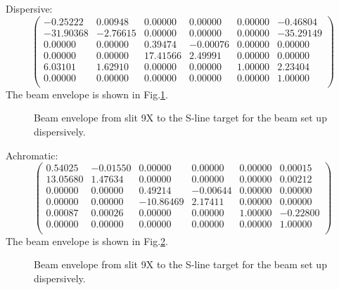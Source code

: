 \documentclass[11pt]{report}
\begin{document}
Dispersive:
\begin{equation}
\begin{pmatrix}
   -0.25222  &  0.00948  & 0.00000  & 0.00000  & 0.00000 & -0.46804 \\
   -31.90368 & -2.76615  & 0.00000  & 0.00000  & 0.00000 &-35.29149 \\
   0.00000   &  0.00000  & 0.39474  & -0.00076 & 0.00000 &  0.00000 \\
   0.00000   &  0.00000  & 17.41566 & 2.49991  & 0.00000 &  0.00000 \\
   6.03101   &  1.62910  & 0.00000  & 0.00000  & 1.00000 &  2.23404 \\
   0.00000   &  0.00000  & 0.00000  & 0.00000  & 0.00000 &  1.00000 \\
\end{pmatrix} 
\end{equation}
\noindent The beam envelope is shown in Fig.\ref{fig:beam-disp}.

\begin{figure}[!ht]
\centerline{\vspace{0cm}\hspace{0cm}
}
\centering
\caption{Beam envelope from slit 9X to the S-line target for the beam set up dispersively.}
\label{fig:beam-disp}
\end{figure} 

Achromatic:
\begin{equation}
\begin{pmatrix}
    0.54025  & -0.01550  & 0.00000   & 0.00000  & 0.00000 &  0.00015 \\
    13.05680 &  1.47634  & 0.00000   & 0.00000  & 0.00000 &  0.00212 \\
    0.00000  &  0.00000  & 0.49214   & -0.00644 & 0.00000 &  0.00000 \\ 
    0.00000  &  0.00000  & -10.86469 & 2.17411  & 0.00000 &  0.00000 \\
    0.00087  &  0.00026  & 0.00000   & 0.00000  & 1.00000 & -0.22800 \\ 
    0.00000  &  0.00000  & 0.00000   & 0.00000  & 0.00000 &  1.00000 \\
\end{pmatrix} 
\end{equation}
\noindent The beam envelope is shown in Fig.\ref{fig:beam-achr}.

\begin{figure}[!ht]
\centerline{\vspace{0cm}\hspace{0cm}
}
\centering
\caption{Beam envelope from slit 9X to the S-line target for the beam set up dispersively.}
\label{fig:beam-achr}
\end{figure} 
\end{document}
